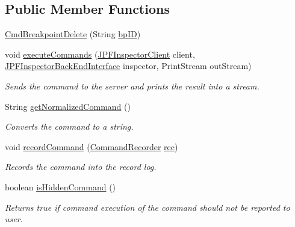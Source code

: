 \subsection*{Public Member Functions}
\begin{DoxyCompactItemize}
\item 
\hyperlink{classgov_1_1nasa_1_1jpf_1_1inspector_1_1client_1_1commands_1_1_cmd_breakpoint_delete_ab06b211aaef6f1ed6a96c64e0109ace9}{Cmd\+Breakpoint\+Delete} (String \hyperlink{classgov_1_1nasa_1_1jpf_1_1inspector_1_1client_1_1commands_1_1_cmd_breakpoint_delete_ae86109f41e146a0e2085efb3d03fb9f1}{bp\+ID})
\item 
void \hyperlink{classgov_1_1nasa_1_1jpf_1_1inspector_1_1client_1_1commands_1_1_cmd_breakpoint_delete_aabf31c93d11e9a9d2483ca562c70d181}{execute\+Commands} (\hyperlink{classgov_1_1nasa_1_1jpf_1_1inspector_1_1client_1_1_j_p_f_inspector_client}{J\+P\+F\+Inspector\+Client} client, \hyperlink{interfacegov_1_1nasa_1_1jpf_1_1inspector_1_1interfaces_1_1_j_p_f_inspector_back_end_interface}{J\+P\+F\+Inspector\+Back\+End\+Interface} inspector, Print\+Stream out\+Stream)
\begin{DoxyCompactList}\small\item\em Sends the command to the server and prints the result into a stream. \end{DoxyCompactList}\item 
String \hyperlink{classgov_1_1nasa_1_1jpf_1_1inspector_1_1client_1_1commands_1_1_cmd_breakpoint_delete_ab4537b4e42bfad64da18ae10f7417fca}{get\+Normalized\+Command} ()
\begin{DoxyCompactList}\small\item\em Converts the command to a string. \end{DoxyCompactList}\item 
void \hyperlink{classgov_1_1nasa_1_1jpf_1_1inspector_1_1client_1_1_client_command_ae0670332ec750bc5b9016d0b04d8adfe}{record\+Command} (\hyperlink{classgov_1_1nasa_1_1jpf_1_1inspector_1_1client_1_1_command_recorder}{Command\+Recorder} \hyperlink{classgov_1_1nasa_1_1jpf_1_1inspector_1_1client_1_1_client_command_af4246f2427035c72a6af45a2c61361f7}{rec})
\begin{DoxyCompactList}\small\item\em Records the command into the record log. \end{DoxyCompactList}\item 
boolean \hyperlink{classgov_1_1nasa_1_1jpf_1_1inspector_1_1client_1_1_client_command_afb09c400c64e2d8e01059b91ff847761}{is\+Hidden\+Command} ()
\begin{DoxyCompactList}\small\item\em Returns true if command execution of the command should not be reported to user. \end{DoxyCompactList}\end{DoxyCompactItemize}
